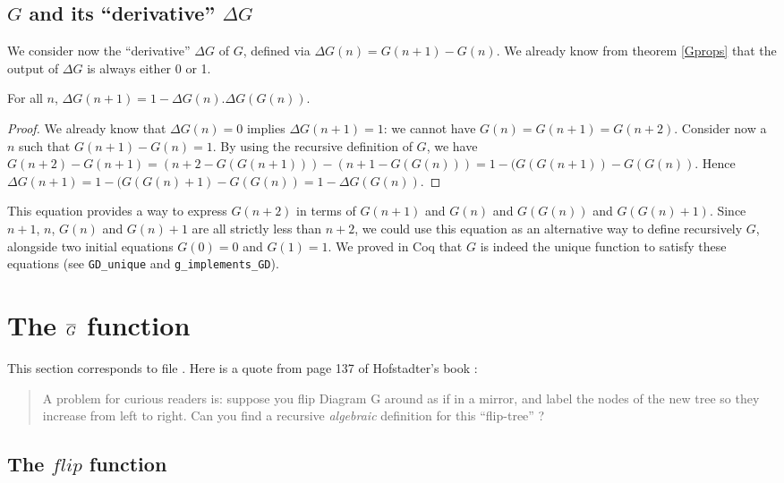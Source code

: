 \documentclass[a4paper,11pt]{article}
\begin{document}
\subsection{$G$ and its ``derivative'' $\Delta G$}
\label{deltaG}

We consider now the ``derivative'' $\Delta G$ of $G$, defined via
$\Delta G(n) = G(n+1)-G(n)$. We already know from theorem
\ref{Gprops} that the output of $\Delta G$ is always either 0 or 1.

\begin{theorem}\label{Gdelta}
For all $n$, $\Delta G(n+1) = 1 - \Delta G(n).\Delta G(G(n))$.
\end{theorem}
\begin{proof}
We already know that $\Delta G(n)=0$ implies $\Delta G(n+1)=1$:
we cannot have $G(n)=G(n+1)=G(n+2)$.
Consider now a $n$ such that
$G(n+1)-G(n)=1$. By using the recursive definition of $G$, we have
$G(n+2)-G(n+1)=(n+2-G(G(n+1)))-(n+1-G(G(n))) = 1 - (G(G(n+1))-G(G(n))$.
Hence $\Delta G(n+1) = 1 - (G(G(n)+1)-G(G(n)) = 1 - \Delta G(G(n))$.
\end{proof}

This equation provides a way to express $G(n+2)$ in terms of
$G(n+1)$ and $G(n)$ and $G(G(n))$ and $G(G(n)+1)$. Since
$n+1$, $n$, $G(n)$ and $G(n)+1$ are all strictly less than $n+2$,
we could use this equation as an alternative way to define
recursively $G$,
alongside two initial equations $G(0)=0$ and $G(1)=1$.
We proved in Coq that $G$ is indeed the unique function to
satisfy these equations (see {\tt GD\_unique} and
{\tt  g\_implements\_GD}).

\section{The $\overline{G}$ function}

This section corresponds to file .
Here is a quote from page 137 of Hofstadter's book \cite{GEB}:
\begin{quote}
A problem for curious readers is: suppose you flip Diagram G
around as if in a mirror, and label the nodes of the new tree so they
increase from left to right. Can you find a recursive \emph{algebraic}
definition for this ``flip-tree'' ?
\end{quote}

\subsection{The $flip$ function}
\end{document}
